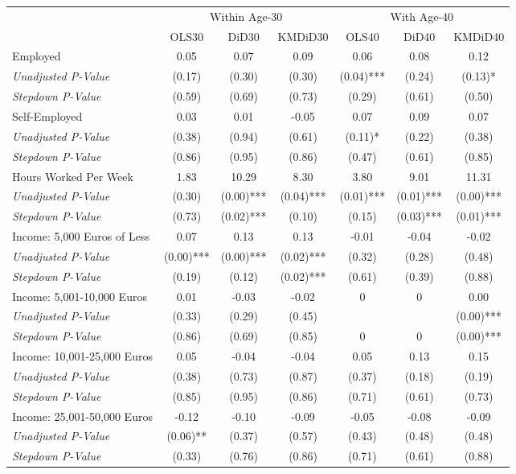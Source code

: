 \begin{tabular}{l c c c c c c}
\toprule
& \multicolumn{3}{c}{Within Age-30} & \multicolumn{3}{c}{With Age-40} \\\cmidrule(lr){2-4} \cmidrule(lr){5-7}
 & OLS30 & DiD30 & KMDiD30 & OLS40 & DiD40 & KMDiD40 \\
\midrule
Employed & 0.05 & 0.07 & 0.09 & 0.06 & 0.08 & 0.12 \\
\quad \textit{Unadjusted P-Value} & (0.17) & (0.30) & (0.30) & (0.04)*** & (0.24) & (0.13)* \\
\quad \textit{Stepdown P-Value} & (0.59) & (0.69) & (0.73) & (0.29) & (0.61) & (0.50) \\
Self-Employed & 0.03 & 0.01 & -0.05 & 0.07 & 0.09 & 0.07 \\
\quad \textit{Unadjusted P-Value} & (0.38) & (0.94) & (0.61) & (0.11)* & (0.22) & (0.38) \\
\quad \textit{Stepdown P-Value} & (0.86) & (0.95) & (0.86) & (0.47) & (0.61) & (0.85) \\
Hours Worked Per Week & 1.83 & 10.29 & 8.30 & 3.80 & 9.01 & 11.31 \\
\quad \textit{Unadjusted P-Value} & (0.30) & (0.00)*** & (0.04)*** & (0.01)*** & (0.01)*** & (0.00)*** \\
\quad \textit{Stepdown P-Value} & (0.73) & (0.02)*** & (0.10) & (0.15) & (0.03)*** & (0.01)*** \\
Income: 5,000 Euros of Less & 0.07 & 0.13 & 0.13 & -0.01 & -0.04 & -0.02 \\
\quad \textit{Unadjusted P-Value} & (0.00)*** & (0.00)*** & (0.02)*** & (0.32) & (0.28) & (0.48) \\
\quad \textit{Stepdown P-Value} & (0.19) & (0.12) & (0.02)*** & (0.61) & (0.39) & (0.88) \\
Income: 5,001-10,000 Euros & 0.01 & -0.03 & -0.02 & 0 & 0 & 0.00 \\
\quad \textit{Unadjusted P-Value} & (0.33) & (0.29) & (0.45) & & & (0.00)*** \\
\quad \textit{Stepdown P-Value} & (0.86) & (0.69) & (0.85) & 0 & 0 & (0.00)*** \\
Income: 10,001-25,000 Euros & 0.05 & -0.04 & -0.04 & 0.05 & 0.13 & 0.15 \\
\quad \textit{Unadjusted P-Value} & (0.38) & (0.73) & (0.87) & (0.37) & (0.18) & (0.19) \\
\quad \textit{Stepdown P-Value} & (0.85) & (0.95) & (0.86) & (0.71) & (0.61) & (0.73) \\
Income: 25,001-50,000 Euros & -0.12 & -0.10 & -0.09 & -0.05 & -0.08 & -0.09 \\
\quad \textit{Unadjusted P-Value} & (0.06)** & (0.37) & (0.57) & (0.43) & (0.48) & (0.48) \\
\quad \textit{Stepdown P-Value} & (0.33) & (0.76) & (0.86) & (0.71) & (0.61) & (0.88) \\
\bottomrule
\end{tabular}
